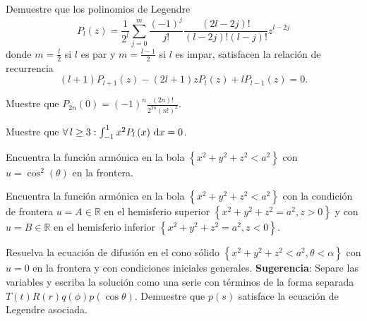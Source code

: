 \question

Demuestre que los polinomios de Legendre
\begin{equation*}
	P_{l}\left(z\right)=
	\frac{1}{2^{l}}
	\sum_{j=0}^{m}
	\frac{{\left(-1\right)}^{j}}{j!}
	\frac{\left(2l-2j\right)!}{\left(l-2j\right)!\left(l-j\right)!}z^{l-2j}
\end{equation*}
donde $m=\frac{l}{2}$ si $l$ es par y $m=\frac{l-1}{2}$ si $l$ es impar,
satisfacen la relación de recurrencia
\begin{equation*}
	\left(l+1\right)
	P_{l+1}\left(z\right)-
	\left(2l+1\right)z
	P_{l}\left(z\right)+
	lP_{l-1}\left(z\right)=0.
\end{equation*}

\question

Muestre que
\begin{math}
	P_{2n}\left(0\right)=
		{\left(-1\right)}^{n}
	\frac{\left(2n\right)!}{2^{2n}{\left(n!\right)}^{2}}
\end{math}.

\question

Muestre que $\forall l\geq 3:\int_{-1}^{1}x^{2}P_{l}\left(x\right)\dl x=0$.

\question

Encuentra la función armónica en la bola
\begin{math}
	\left\{
	x^{2}+
	y^{2}+
	z^{2}<
	a^{2}
	\right\}
\end{math}
con $u=\cos^{2}\left(\theta\right)$ en la frontera.

\question

Encuentra la función armónica en la bola
\begin{math}
	\left\{
	x^{2}+
	y^{2}+
	z^{2}<
	a^{2}
	\right\}
\end{math}
con la condición de frontera $u=A\in\mathbb{R}$ en el hemisferio superior
\begin{math}
	\left\{
	x^{2}+
	y^{2}+
	z^{2}=
	a^{2},
	z>0\right\}
\end{math}
y con $u=B\in\mathbb{R}$ en el hemisferio inferior
\begin{math}
	\left\{
	x^{2}+
	y^{2}+
	z^{2}=
	a^{2},
	z<0
	\right\}
\end{math}.

\question

Resuelva la ecuación de difusión en el cono sólido
\begin{math}
	\left\{
	x^{2}+
	y^{2}+
	z^{2}<
	a^{2},
	\theta<\alpha
	\right\}
\end{math}
con $u=0$ en la frontera y con condiciones iniciales generales.
\textbf{Sugerencia}: Separe las variables y escriba la solución como una
serie con términos de la forma separada
\begin{math}
	T\left(t\right)
	R\left(r\right)
	q\left(\phi\right)
	p\left(\cos\theta\right)
\end{math}.
Demuestre que $p\left(s\right)$ satisface la ecuación de Legendre
asociada.
